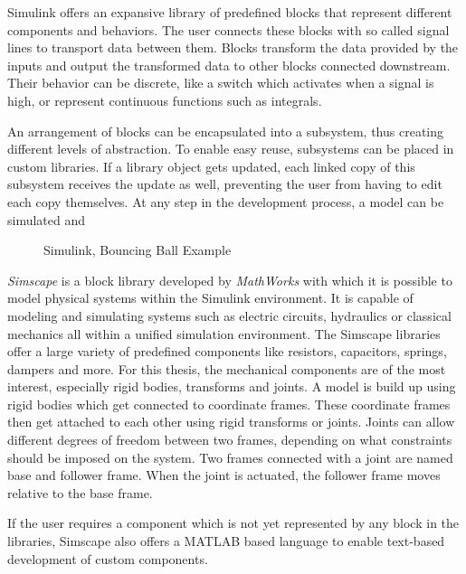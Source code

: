 Simulink offers an expansive library of predefined blocks that represent different components and behaviors.
The user connects these blocks with so called signal lines to transport data between them.
Blocks transform the data provided by the inputs and output the transformed data to other blocks connected downstream.
Their behavior can be discrete, like a switch which activates when a signal is high, or represent continuous functions such as integrals.

An arrangement of blocks can be encapsulated into a subsystem, thus creating different levels of abstraction.
To enable easy reuse, subsystems can be placed in custom libraries.
If a library object gets updated, each linked copy of this subsystem receives the update as well, preventing the user from having to edit each copy themselves.
At any step in the development process, a model can be simulated and 

\begin{figure}
	\centerline{}
	\caption{Simulink, Bouncing Ball Example}
	\label{Simulink Bouncing Ball Example}
\end{figure}

\textit{Simscape\textsuperscript{\texttrademark}} is a block library developed by \textit{MathWorks\textsuperscript{\textregistered}} with which it is possible to model physical systems within the Simulink environment.
It is capable of modeling and simulating systems such as electric circuits, hydraulics or classical mechanics all within a unified simulation environment.
The Simscape libraries offer a large variety of predefined components like resistors, capacitors, springs, dampers and more.
For this thesis, the mechanical components are of the most interest, especially rigid bodies, transforms and joints.
A model is build up using rigid bodies which get connected to coordinate frames.
These coordinate frames then get attached to each other using rigid transforms or joints.
Joints can allow different degrees of freedom between two frames, depending on what constraints should be imposed on the system.
Two frames connected with a joint are named base and follower frame.
When the joint is actuated, the follower frame moves relative to the base frame\parencite{thilderkvist2015motion}.

If the user requires a component which is not yet represented by any block in the libraries, Simscape also offers a MATLAB based language to enable text-based development of custom components.

